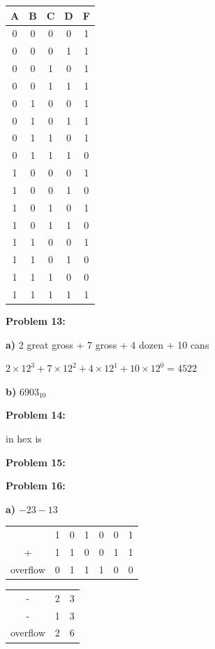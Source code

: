 \documentclass{article}
\begin{document}
    \begin{center}
        \begin{tabular}{ c|c|c|c|c }
            A & B & C & D & F \\
            \hline
            0 & 0 & 0 & 0 & 1 \\
            0 & 0 & 0 & 1 & 1 \\
            0 & 0 & 1 & 0 & 1 \\
            0 & 0 & 1 & 1 & 1 \\
            0 & 1 & 0 & 0 & 1 \\
            0 & 1 & 0 & 1 & 1 \\
            0 & 1 & 1 & 0 & 1 \\
            0 & 1 & 1 & 1 & 0 \\
            1 & 0 & 0 & 0 & 1 \\
            1 & 0 & 0 & 1 & 0 \\
            1 & 0 & 1 & 0 & 1 \\
            1 & 0 & 1 & 1 & 0 \\
            1 & 1 & 0 & 0 & 1 \\
            1 & 1 & 0 & 1 & 0 \\
            1 & 1 & 1 & 0 & 0 \\
            1 & 1 & 1 & 1 & 1
            
        \end{tabular}
    \end{center}

    \textbf{Problem 13:}

    \quad\textbf{a)} 2 great gross + 7 gross + 4 dozen + 10 cans

    \quad\quad $2\times 12^3 + 7 \times 12^2 + 4 \times 12^1 + 10 \times 12^0=\boxed{4522}$

    \quad\textbf{b)} $6903_{10}$

    \quad\quad
    \noindent{}

    \textbf{Problem 14:}

    \quad{} in hex is 

    \textbf{Problem 15:}



    \textbf{Problem 16:}

    \quad\textbf{a)} $-23 - 13$

    \begin{center}
        \begin{tabular}{ ccccccc }
              & 1 & 0 & 1 & 0 & 0 & 1 \\
            + & 1 & 1 & 0 & 0 & 1 & 1  \\
            \hline
            overflow & 0 & 1 & 1 & 1 & 0 & 0
        \end{tabular}
        \quad\quad 
        \begin{tabular}{ ccc }
            - & 2 & 3 \\
            - & 1 & 3 \\
            \hline
            overflow & 2 & 6
        \end{tabular}
    \end{center}
\end{document}
